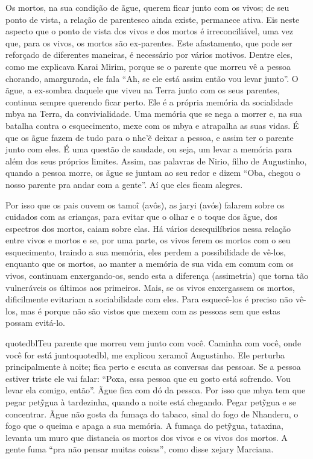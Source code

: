 Os mortos, na sua condição de ãgue, querem ficar junto com os vivos; de
seu ponto de vista, a relação de parentesco ainda existe, permanece
ativa. Eis neste aspecto que o ponto de vista dos vivos e dos mortos é
irreconciliável, uma vez que, para os vivos, os mortos são ex-parentes. 
Este afastamento, que pode ser reforçado de diferentes maneiras, é
necessário por vários motivos. Dentre eles, como me explicava Karai
Mirim, porque se o parente que morreu vê a pessoa chorando, amargurada,
ele fala ``Ah, se ele está assim então vou levar junto''. O ãgue, a
ex-sombra daquele que viveu na Terra junto com os seus parentes,
continua sempre querendo ficar perto. Ele é a própria memória da
socialidade mbya na Terra, da convivialidade. Uma memória que se nega a
morrer e, na sua batalha contra o esquecimento, mexe com os mbya e
atrapalha as suas vidas. É que os ãgue fazem de tudo para o nhe’\~{e}
deixar a pessoa, e assim ter o parente junto com eles. É uma questão de
saudade, ou seja, um levar a memória para além dos seus próprios
limites. Assim, nas palavras de Nirio, filho de Augustinho, quando a
pessoa morre, os ãgue se juntam ao seu redor e dizem ``Oba, chegou o
nosso parente pra andar com a gente''. Aí que eles ficam alegres.

Por isso que os pais ouvem os tamo\~{i} (avôs), as jaryi (avós) falarem
sobre os cuidados com as crianças, para evitar que o olhar e o toque
dos ãgue, dos espectros dos mortos, caiam sobre elas. Há vários
desequilíbrios nessa relação entre vivos e mortos e se, por uma parte,
os vivos ferem os mortos com o seu esquecimento, traindo a sua memória,
eles perdem a possibilidade de vê-los, enquanto que os mortos, ao
manter a memória de sua vida em comum com os vivos, continuam
enxergando-os, sendo esta a diferença (assimetria) que torna tão
vulneráveis os últimos aos primeiros. Mais, se os vivos enxergassem os
mortos, dificilmente evitariam a sociabilidade com eles. Para
esquecê-los é preciso não vê-los, mas é porque não são vistos que mexem
com as pessoas sem que estas possam evitá-lo.

{quotedbl}Teu parente que morreu vem junto com você. Caminha com
você, onde você for está junto{quotedbl}, me explicou xeramo\~{i}
Augustinho. Ele perturba principalmente à noite; fica perto e escuta as
conversas das pessoas. Se a pessoa estiver triste ele vai falar: ``Poxa,
essa pessoa que eu gosto está sofrendo. Vou levar ela comigo, então''.
Ãgue fica com dó da pessoa. Por isso que mbya tem que pegar pet\~{y}gua
à tardezinha, quando a noite está chegando. Pegar pet\~{y}gua e se
concentrar. Ãgue não gosta da fumaça do tabaco, sinal do fogo de
Nhanderu, o fogo que o queima e apaga a sua memória. A fumaça do
pet\~{y}gua, tataxina, levanta um muro que distancia os mortos dos
vivos e os vivos dos mortos. A gente fuma ``pra não pensar muitas
coisas'', como disse xejary Marciana.


